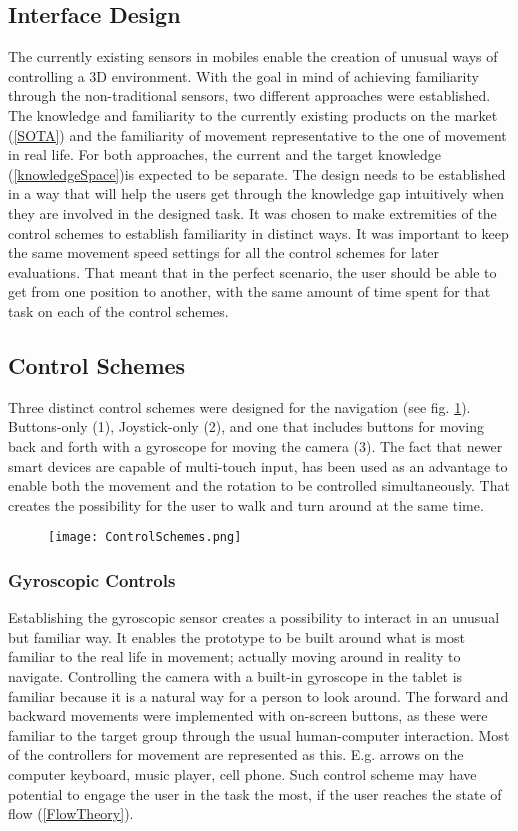 \subsection{Interface Design}
The currently existing sensors in mobiles enable the creation of unusual ways of controlling a 3D environment. With the goal in mind of achieving familiarity through the non-traditional sensors, two different approaches were established. The knowledge and familiarity to the currently existing products on the market (\ref{SOTA}) and the familiarity of movement representative to the one of movement in real life. For both approaches, the current and the target knowledge (\ref{knowledgeSpace})is expected to be separate. The design needs to be established in a way that will help the users get through the knowledge gap intuitively when they are involved in the designed task. It was chosen to make extremities of the control schemes to establish familiarity in distinct ways. It was important to keep the same movement speed settings for all the control schemes for later evaluations. That meant that in the perfect scenario, the user should be able to get from one position to another, with the same amount of time spent for that task on each of the control schemes.

\subsection{Control Schemes}
Three distinct control schemes were designed for the navigation (see fig. \ref{fig:ControlSchemes}). Buttons-only (1), Joystick-only (2), and one that includes buttons for moving back and forth with a gyroscope for moving the camera (3). The fact that newer smart devices are capable of multi-touch input, has been used as an advantage to enable both the movement and the rotation to be controlled simultaneously. That creates the possibility for the user to walk and turn around at the same time.

\begin{figure}[H]
\label{fig:ControlSchemes}
\centering
  \texttt{[image: ControlSchemes.png]}
\end{figure}

\subsubsection{Gyroscopic Controls}
Establishing the gyroscopic sensor creates a possibility to interact in an unusual but familiar way. It enables the prototype to be built around what is most familiar to the real life in movement; actually moving around in reality to navigate.
Controlling the camera with a built-in gyroscope in the tablet is familiar because it is a natural way for a person to look around. The forward and backward movements were implemented with on-screen buttons, as these were familiar to the target group through the usual human-computer interaction. Most of the controllers for movement are represented as this. E.g. arrows on the computer keyboard, music player, cell phone.
Such control scheme may have potential to engage the user in the task the most, if the user reaches the state of flow (\ref{FlowTheory}). 

